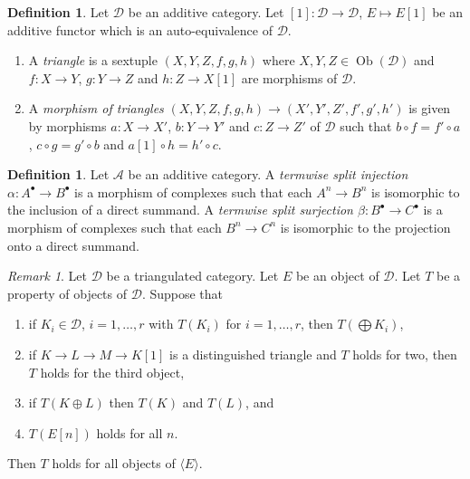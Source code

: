 \documentclass{amsart}
\theoremstyle{plain}
\theoremstyle{definition}
\newtheorem{definition}[subsection]{Definition}
\theoremstyle{remark}
\newtheorem{remark}[subsection]{Remark}
\numberwithin{equation}{subsection}
\def\Ob{\mathop{\mathrm{Ob}}\nolimits}
\begin{document}
\begin{definition}
\label{derived-definition-triangle}
Let $\mathcal{D}$ be an additive category. Let
$[1] : \mathcal{D} \to \mathcal{D}$, $E \mapsto E[1]$
be an additive functor which is an auto-equivalence of $\mathcal{D}$.
\begin{enumerate}
\item A {\it triangle} is a sextuple
$(X, Y, Z, f, g, h)$ where $X, Y, Z \in \Ob(\mathcal{D})$ and
$f : X \to Y$, $g : Y \to Z$ and $h : Z \to X[1]$ are morphisms
of $\mathcal{D}$.
\item A {\it morphism of triangles}
$(X, Y, Z, f, g, h) \to (X', Y', Z', f', g', h')$
is given by morphisms $a : X \to X'$, $b : Y \to Y'$ and $c : Z \to Z'$
of $\mathcal{D}$ such that
$b \circ f = f' \circ a$, $c  \circ g = g' \circ b$ and
$a[1] \circ h = h' \circ c$.
\end{enumerate}
\end{definition}

\begin{definition}
\label{derived-definition-termwise-split-map}
Let $\mathcal{A}$ be an additive category.
A {\it termwise split injection $\alpha : A^\bullet \to B^\bullet$}
is a morphism of complexes such that each $A^n \to B^n$
is isomorphic to the inclusion of a direct summand.
A {\it termwise split surjection $\beta : B^\bullet \to C^\bullet$}
is a morphism of complexes such that each $B^n \to C^n$
is isomorphic to the projection onto a direct summand.
\end{definition}

\begin{remark}
\label{derived-remark-check-on-generator}
Let $\mathcal{D}$ be a triangulated category. Let $E$ be an object
of $\mathcal{D}$. Let $T$ be a property of objects of $\mathcal{D}$.
Suppose that
\begin{enumerate}
\item if $K_i \in \mathcal{D}$, $i = 1, \ldots, r$ with
$T(K_i)$ for $i = 1, \ldots, r$, then $T(\bigoplus K_i)$,
\item if $K \to L \to M \to K[1]$ is a distinguished triangle and
$T$ holds for two, then $T$ holds for the third object,
\item if $T(K \oplus L)$ then $T(K)$ and $T(L)$, and
\item $T(E[n])$ holds for all $n$.
\end{enumerate}
Then $T$ holds for all objects of $\langle E \rangle$.
\end{remark}
\end{document}
